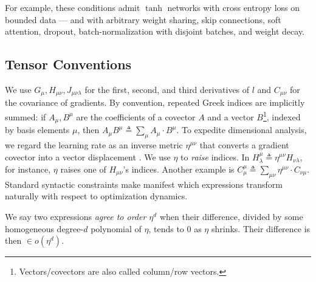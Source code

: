 \documentclass{article}
\theoremstyle{plain}
\theoremstyle{definition}
\begin{document}

        For example, these conditions admit $\tanh$ networks with cross entropy
        loss on bounded data --- and with arbitrary weight sharing, skip
        connections, soft attention, dropout, batch-normalization with disjoint
        batches, and weight decay.
        

    \subsection{Tensor Conventions}
        We use $G_\mu, H_{\mu\nu}, J_{\mu\nu\lambda}$ for the first, second,
        and third derivatives of $l$ and $C_{\mu \nu}$ for the covariance of
        gradients.  By convention, repeated Greek indices are implicitly
        summed: if $A_\mu, B^\mu$ are the coefficients of a covector $A$ and a
        vector
        $B$\footnote{
            Vectors/covectors are also called column/row vectors.
        }, indexed by basis elements $\mu$, then
        $
            A_\mu B^\mu
            \triangleq
            \sum_\mu A_\mu \cdot B^\mu
        $.
        To expedite dimensional analysis, we regard the learning rate as an
        inverse metric $\eta^{\mu\nu}$ that converts a gradient covector into a
        vector displacement \citep{bo13}.  We use $\eta$ to \emph{raise}
        indices.  In
        $
            H^{\mu}_{\lambda}
            \triangleq
            \eta^{\mu\nu} H_{\nu\lambda}
        $, for instance,
        $\eta$ raises one of $H_{\mu\nu}$'s indices.  Another example is
        $
            C^{\mu}_{\mu}
            \triangleq
            \sum_{\mu \nu} \eta^{\mu\nu} \cdot C_{\nu\mu}
        $.
        Standard syntactic constraints make manifest which expressions
        transform naturally with respect to optimization dynamics.  

        We say two expressions \emph{agree to order $\eta^d$} when
        their difference, divided by some homogeneous degree-$d$
        polynomial of $\eta$, tends to $0$ as $\eta$ shrinks.  Their
        difference is then $\in o(\eta^d)$.
        
\end{document}
